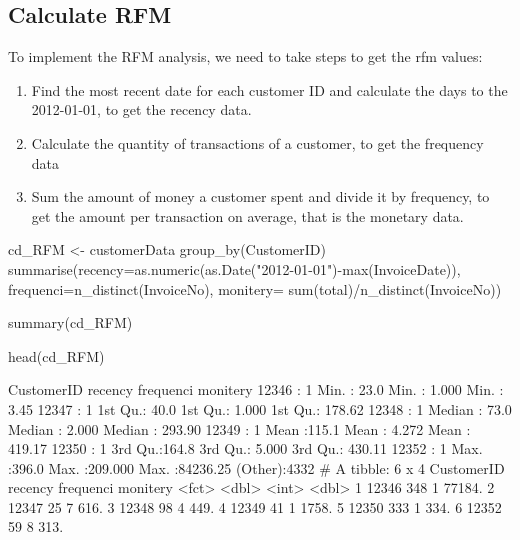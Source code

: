 \hypertarget{calculate-rfm}{%
\subsection{Calculate RFM}\label{calculate-rfm}}

To implement the RFM analysis, we need to take steps to get the rfm
values:

\begin{enumerate}
\def\labelenumi{\arabic{enumi}.}
\tightlist
\item
  Find the most recent date for each customer ID and calculate the days
  to the 2012-01-01, to get the recency data.
\item
  Calculate the quantity of transactions of a customer, to get the
  frequency data
\item
  Sum the amount of money a customer spent and divide it by frequency,
  to get the amount per transaction on average, that is the monetary
  data.
\end{enumerate}

\begin{Schunk}
\begin{Sinput}
cd_RFM <- customerData %>% 
  group_by(CustomerID) %>% 
  summarise(recency=as.numeric(as.Date("2012-01-01")-max(InvoiceDate)),
            frequenci=n_distinct(InvoiceNo), monitery= sum(total)/n_distinct(InvoiceNo)) 

summary(cd_RFM)

head(cd_RFM)
\end{Sinput}
\begin{Soutput}
   CustomerID      recency        frequenci          monitery       
 12346  :   1   Min.   : 23.0   Min.   :  1.000   Min.   :    3.45  
 12347  :   1   1st Qu.: 40.0   1st Qu.:  1.000   1st Qu.:  178.62  
 12348  :   1   Median : 73.0   Median :  2.000   Median :  293.90  
 12349  :   1   Mean   :115.1   Mean   :  4.272   Mean   :  419.17  
 12350  :   1   3rd Qu.:164.8   3rd Qu.:  5.000   3rd Qu.:  430.11  
 12352  :   1   Max.   :396.0   Max.   :209.000   Max.   :84236.25  
 (Other):4332                                                       
# A tibble: 6 x 4
  CustomerID recency frequenci monitery
  <fct>        <dbl>     <int>    <dbl>
1 12346          348         1   77184.
2 12347           25         7     616.
3 12348           98         4     449.
4 12349           41         1    1758.
5 12350          333         1     334.
6 12352           59         8     313.
\end{Soutput}
\end{Schunk}

